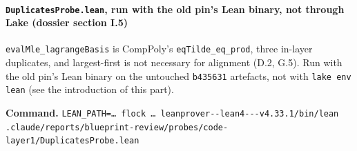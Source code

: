 \paragraph{\texttt{DuplicatesProbe.\allowbreak{}lean}, run with the old pin's Lean binary, not through Lake (dossier section I.5)}\label{sec:gen-layer1-I5}

\texttt{evalMle\_\allowbreak{}lagrangeBasis} is CompPoly's \texttt{eqTilde\_\allowbreak{}eq\_\allowbreak{}prod}, three in-layer duplicates, and largest-first is not necessary for alignment (D.2, G.5). Run with the old pin's Lean binary on the untouched \texttt{b435631} artefacts, not with \texttt{lake env lean} (see the introduction of this part).

\textbf{Command.} \texttt{L\allowbreak{}E\allowbreak{}A\allowbreak{}N\allowbreak{}\_\allowbreak{}P\allowbreak{}A\allowbreak{}T\allowbreak{}H\allowbreak{}=\allowbreak{}…\allowbreak{} f\allowbreak{}l\allowbreak{}o\allowbreak{}c\allowbreak{}k\allowbreak{} …\allowbreak{} l\allowbreak{}e\allowbreak{}a\allowbreak{}n\allowbreak{}p\allowbreak{}r\allowbreak{}o\allowbreak{}v\allowbreak{}e\allowbreak{}r\allowbreak{}-{}\allowbreak{}-{}\allowbreak{}l\allowbreak{}e\allowbreak{}a\allowbreak{}n\allowbreak{}4\allowbreak{}-{}\allowbreak{}-{}\allowbreak{}-{}\allowbreak{}v\allowbreak{}4\allowbreak{}.\allowbreak{}3\allowbreak{}3\allowbreak{}.\allowbreak{}1\allowbreak{}/\allowbreak{}b\allowbreak{}i\allowbreak{}n\allowbreak{}/\allowbreak{}l\allowbreak{}e\allowbreak{}a\allowbreak{}n\allowbreak{} .\allowbreak{}c\allowbreak{}l\allowbreak{}a\allowbreak{}u\allowbreak{}d\allowbreak{}e\allowbreak{}/\allowbreak{}r\allowbreak{}e\allowbreak{}p\allowbreak{}o\allowbreak{}r\allowbreak{}t\allowbreak{}s\allowbreak{}/\allowbreak{}b\allowbreak{}l\allowbreak{}u\allowbreak{}e\allowbreak{}p\allowbreak{}r\allowbreak{}i\allowbreak{}n\allowbreak{}t\allowbreak{}-{}\allowbreak{}r\allowbreak{}e\allowbreak{}v\allowbreak{}i\allowbreak{}e\allowbreak{}w\allowbreak{}/\allowbreak{}p\allowbreak{}r\allowbreak{}o\allowbreak{}b\allowbreak{}e\allowbreak{}s\allowbreak{}/\allowbreak{}c\allowbreak{}o\allowbreak{}d\allowbreak{}e\allowbreak{}-{}\allowbreak{}l\allowbreak{}a\allowbreak{}y\allowbreak{}e\allowbreak{}r\allowbreak{}1\allowbreak{}/\allowbreak{}D\allowbreak{}u\allowbreak{}p\allowbreak{}l\allowbreak{}i\allowbreak{}c\allowbreak{}a\allowbreak{}t\allowbreak{}e\allowbreak{}s\allowbreak{}P\allowbreak{}r\allowbreak{}o\allowbreak{}b\allowbreak{}e\allowbreak{}.\allowbreak{}l\allowbreak{}e\allowbreak{}a\allowbreak{}n}

